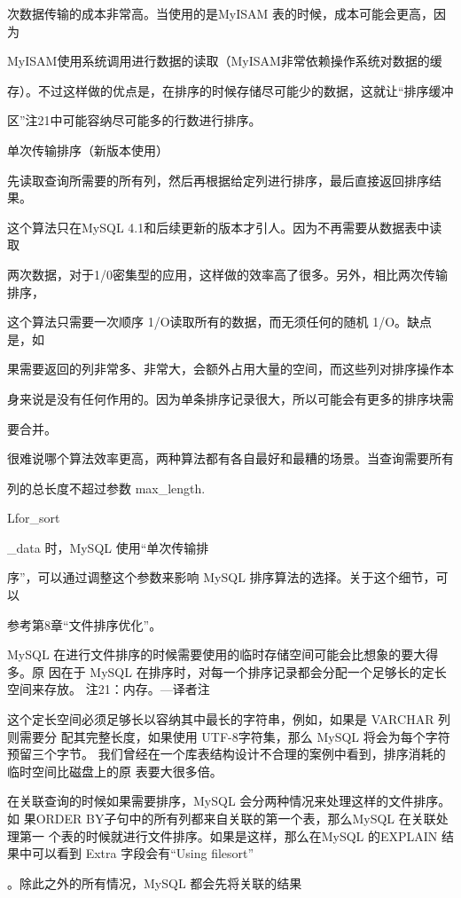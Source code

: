 次数据传输的成本非常高。当使用的是MyISAM 表的时候，成本可能会更高，因为

MyISAM使用系统调用进行数据的读取（MyISAM非常依赖操作系统对数据的缓

存）。不过这样做的优点是，在排序的时候存储尽可能少的数据，这就让“排序缓冲

区”注21中可能容纳尽可能多的行数进行排序。

单次传输排序（新版本使用）

先读取查询所需要的所有列，然后再根据给定列进行排序，最后直接返回排序结果。

这个算法只在MySQL 4.1和后续更新的版本才引人。因为不再需要从数据表中读取

两次数据，对于1/0密集型的应用，这样做的效率高了很多。另外，相比两次传输排序，

这个算法只需要一次顺序 1/O读取所有的数据，而无须任何的随机 1/O。缺点是，如

果需要返回的列非常多、非常大，会额外占用大量的空间，而这些列对排序操作本

身来说是没有任何作用的。因为单条排序记录很大，所以可能会有更多的排序块需

要合并。

很难说哪个算法效率更高，两种算法都有各自最好和最糟的场景。当查询需要所有

列的总长度不超过参数 max\_length.

Lfor\_sort

\_data 时，MySQL 使用“单次传输排

序”，可以通过调整这个参数来影响 MySQL 排序算法的选择。关于这个细节，可以

参考第8章“文件排序优化”。

MySQL 在进行文件排序的时候需要使用的临时存储空间可能会比想象的要大得多。原
因在于 MySQL 在排序时，对每一个排序记录都会分配一个足够长的定长空间来存放。
注21：内存。—译者注

这个定长空间必须足够长以容纳其中最长的字符串，例如，如果是 VARCHAR 列则需要分
配其完整长度，如果使用 UTF-8字符集，那么 MySQL 将会为每个字符预留三个字节。
我们曾经在一个库表结构设计不合理的案例中看到，排序消耗的临时空间比磁盘上的原
表要大很多倍。

在关联查询的时候如果需要排序，MySQL 会分两种情况来处理这样的文件排序。如
果ORDER BY子句中的所有列都来自关联的第一个表，那么MySQL 在关联处理第一
个表的时候就进行文件排序。如果是这样，那么在MySQL 的EXPLAIN 结果中可以看到
Extra 字段会有“Using filesort”

。除此之外的所有情况，MySQL 都会先将关联的结果

